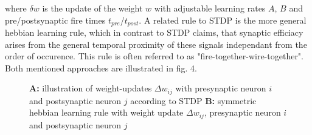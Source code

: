 \documentclass[letterpaper, 10 pt, conference]{ieeeconf}  %
\begin{document}
where $\delta w$ is the update of the weight $w$ with adjustable learning rates $A$, $B$ and pre/postsynaptic fire times $t_{pre}$/$t_{post}$. A 
related rule to STDP is the more general hebbian learning rule, which in contrast to STDP claims, that synaptic efficiacy arises from the 
general temporal proximity of these signals independant from the order of occurence. This rule is often referred to as "fire-together-wire-together".
Both mentioned approaches are illustrated in fig. 4.

\begin{figure}[thpb]
        \centering
  \caption{\textbf{A: } illustration of weight-updates $\Delta w_{ij}$ with presynaptic neuron $i$ and postsynaptic neuron $j$ according to STDP \newline 
  \textbf{B: } symmetric hebbian learning rule with weight update $\Delta w_{ij}$, presynaptic neuron $i$ and postsynaptic neuron $j$}
        \label{figurelabel}
\end{figure}
\end{document}
